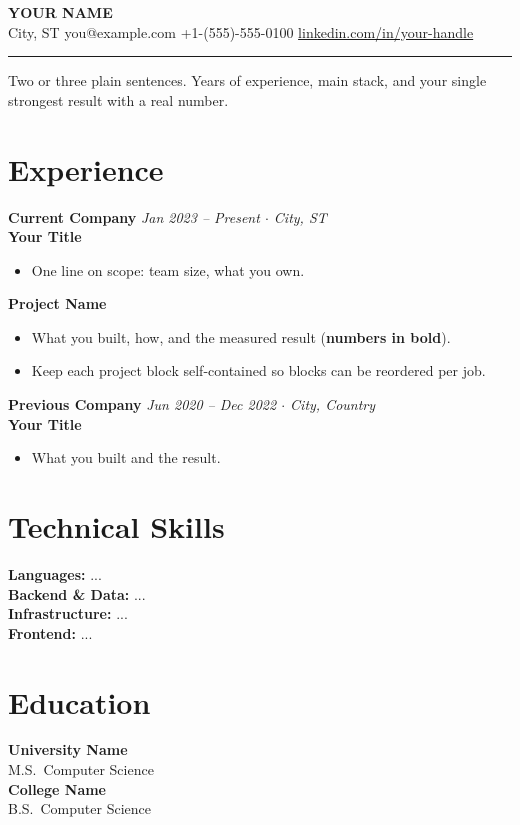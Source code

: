 \documentclass[10pt, letterpaper]{article}
\newcommand{\jobtitle}[4]{%
  \needspace{6\baselineskip}
  \vspace{6pt}
  \noindent\textbf{#1} \hfill {\small\color{muted}\textit{#3 $\cdot$ #4}}\\[-2pt]
  \textbf{#2}
  \vspace{2pt}
}
\newcommand{\subproject}[1]{%
  \vspace{7pt}
  \noindent\textbf{\small #1}
  \vspace{1pt}
}
\newcommand{\skillrow}[2]{%
  \noindent\textbf{#1:} #2\\[3pt]
}
\begin{document}
\begin{center}
  {\LARGE\bfseries YOUR NAME}\\[5pt]
  {\small\color{muted}
    City, ST \quad\textbar\quad
    you@example.com \quad\textbar\quad
    +1-(555)-555-0100 \quad\textbar\quad
    \href{https://www.linkedin.com/in/your-handle/}{linkedin.com/in/your-handle}
  }
\end{center}

\vspace{-4pt}
\noindent\color{ruler}\rule{\linewidth}{0.6pt}
\color{black}

\noindent Two or three plain sentences. Years of experience, main stack, and your single strongest result with a real number.

\section{Experience}

\jobtitle{Current Company}{Your Title}{Jan 2023 -- Present}{City, ST}
\begin{itemize}
  \item One line on scope: team size, what you own.
\end{itemize}

\subproject{Project Name}
\begin{itemize}
  \item What you built, how, and the measured result (\textbf{numbers in bold}).
  \item Keep each project block self-contained so blocks can be reordered per job.
\end{itemize}

\jobtitle{Previous Company}{Your Title}{Jun 2020 -- Dec 2022}{City, Country}
\begin{itemize}
  \item What you built and the result.
\end{itemize}

\section{Technical Skills}
\skillrow{Languages}{...}
\skillrow{Backend \& Data}{...}
\skillrow{Infrastructure}{...}
\skillrow{Frontend}{...}

\section{Education}
\noindent\textbf{University Name}\\
M.S.\ Computer Science\\[4pt]
\noindent\textbf{College Name}\\
B.S.\ Computer Science
\end{document}
